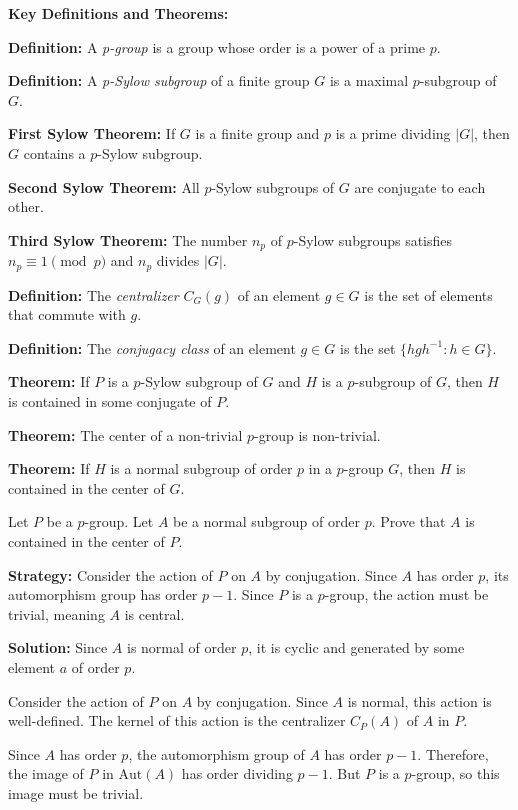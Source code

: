 \textbf{Key Definitions and Theorems:}

\textbf{Definition:} A \textit{p-group} is a group whose order is a power of a prime $p$.

\textbf{Definition:} A \textit{p-Sylow subgroup} of a finite group $G$ is a maximal $p$-subgroup of $G$.

\textbf{First Sylow Theorem:} If $G$ is a finite group and $p$ is a prime dividing $|G|$, then $G$ contains a $p$-Sylow subgroup.

\textbf{Second Sylow Theorem:} All $p$-Sylow subgroups of $G$ are conjugate to each other.

\textbf{Third Sylow Theorem:} The number $n_p$ of $p$-Sylow subgroups satisfies $n_p \equiv 1 \pmod{p}$ and $n_p$ divides $|G|$.

\textbf{Definition:} The \textit{centralizer} $C_G(g)$ of an element $g \in G$ is the set of elements that commute with $g$.

\textbf{Definition:} The \textit{conjugacy class} of an element $g \in G$ is the set $\{hgh^{-1} : h \in G\}$.

\textbf{Theorem:} If $P$ is a $p$-Sylow subgroup of $G$ and $H$ is a $p$-subgroup of $G$, then $H$ is contained in some conjugate of $P$.

\textbf{Theorem:} The center of a non-trivial $p$-group is non-trivial.

\textbf{Theorem:} If $H$ is a normal subgroup of order $p$ in a $p$-group $G$, then $H$ is contained in the center of $G$.

\begin{problembox}
Let $P$ be a $p$-group. Let $A$ be a normal subgroup of order $p$. Prove that $A$ is contained in the center of $P$.
\end{problembox}

\noindent\textbf{Strategy:} Consider the action of $P$ on $A$ by conjugation. Since $A$ has order $p$, its automorphism group has order $p-1$. Since $P$ is a $p$-group, the action must be trivial, meaning $A$ is central.

\noindent\textbf{Solution:} Since $A$ is normal of order $p$, it is cyclic and generated by some element $a$ of order $p$. 

Consider the action of $P$ on $A$ by conjugation. Since $A$ is normal, this action is well-defined. The kernel of this action is the centralizer $C_P(A)$ of $A$ in $P$.

Since $A$ has order $p$, the automorphism group of $A$ has order $p-1$. Therefore, the image of $P$ in $\text{Aut}(A)$ has order dividing $p-1$. But $P$ is a $p$-group, so this image must be trivial.

